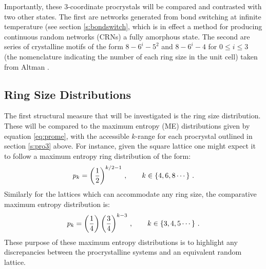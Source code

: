 Importantly, these 3\--coordinate procrystals will be compared and contrasted with two other states.
The first are networks generated from bond switching at infinite temperature (see section \ref{s:bondswitch}, which is in effect a method for producing continuous random networks (CRNs) \ie{} a fully amorphous state.
The second are series of crystalline motifs of the form $8-6^i-5^2$ and $8-6^i-4$ for $0\leq i\leq3$ (the nomenclature indicating the number of each ring size in the unit cell) taken from Altman \etal{} \cite{Malashevich2016}.

\subsection{Ring Size Distributions}
\label{s:pro3pk}

The first structural measure that will be investigated is the ring size distribution.
These will be compared to the maximum entropy (ME) distributions given by equation \ref{eq:prome}, with the accessible $k$\--range for each procrystal outlined in section \ref{s:pro3} above. 
For instance, given the square lattice one might expect it to follow a maximum entropy ring distribution of the form:
\begin{equation}
	p_k = \left(\frac{1}{2}\right)^{k/2-1}\,, \qquad k\in\left\{4,6,8\cdots\right\}\,.
\end{equation}
Similarly for the lattices which can accommodate any ring size, the comparative maximum entropy distribution is:
\begin{equation}
	p_k = \left(\frac{1}{4}\right)\left(\frac{3}{4}\right)^{k-3}\,, \qquad k\in\left\{3,4,5\cdots\right\}\,.
\end{equation}
These purpose of these maximum entropy distributions is to highlight any discrepancies between the procrystalline systems and an equivalent random lattice.

